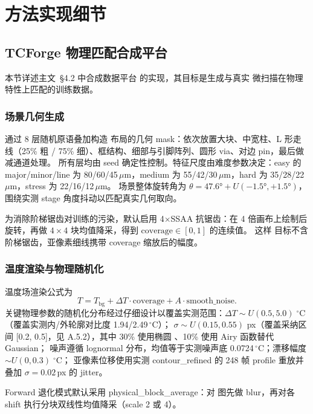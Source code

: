 \section{方法实现细节}

\subsection{TCForge 物理匹配合成平台}

本节详述主文~\S4.2 中合成数据平台  的实现，其目标是生成与真实  微扫描在物理特性上匹配的训练数据。

\subsubsection{场景几何生成}

 通过 8 层随机原语叠加构造  布局的几何 mask：依次放置大块、中宽柱、L 形走线（25\% 粗 / 75\% 细）、框结构、细部与引脚阵列、圆形 via、对边 pin，最后做减通道处理。
所有层均由 seed 确定性控制。特征尺度由难度参数决定：easy 的 major/minor/line 为 80/60/45\,\(\mu\)m，medium 为 55/42/30\,\(\mu\)m，hard 为 35/28/22\,\(\mu\)m，stress 为 22/16/12\,\(\mu\)m。
场景整体旋转角为 \(\theta = 47.6° + U(-1.5°, +1.5°)\)，围绕实测 stage 角度抖动以匹配真实几何取向。

为消除阶梯锯齿对训练的污染，默认启用 4\(\times\)SSAA 抗锯齿：在 4 倍画布上绘制后旋转，再做 \(4 \times 4\) 块均值降采，得到 \(\text{coverage} \in [0, 1]\) 的连续值。
这样  目标不含阶梯锯齿，亚像素细线携带 coverage 缩放后的幅度。

\subsubsection{温度渲染与物理随机化}

温度场渲染公式为
\[
  T = T_{\mathrm{bg}} + \Delta T \cdot \text{coverage} + A \cdot \text{smooth\_noise}.
\]
关键物理参数的随机化分布经过仔细设计以覆盖实测范围：\(\Delta T \sim U(0.5, 5.0)\;^\circ\mathrm{C}\)（覆盖实测内/外轮廓对比度 1.94/2.49\,\(^\circ\)C）；
 \(\sigma \sim U(0.15, 0.55)\)  px（覆盖采纳区间 [0.2, 0.5]，见 A.5.2），其中 30\% 使用椭圆 、10\% 使用 Airy 函数替代 Gaussian；
噪声遵循 lognormal 分布，均值等于实测噪声底 0.0724\,\(^\circ\)C；漂移幅度 \(\sim U(0, 0.3)\;^\circ\mathrm{C}\)；
亚像素位移使用实测 contour\_refined 的 248 帧 profile 重放并叠加 \(\sigma = 0.02\)\,px 的 jitter。

Forward 退化模式默认采用 physical\_block\_average：对  图先做  blur，再对各 shift 执行分块双线性均值降采（scale 2 或 4）。

